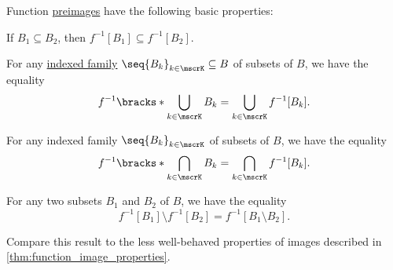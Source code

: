 \begin{proposition}\label{thm:function_preimage_properties}
  Function \hyperref[def:set_valued_map/inverse]{preimages} have the following basic properties:
  \begin{thmenum}
     If \( B_1 \subseteq B_2 \), then \( f^{-1}[B_1] \subseteq f^{-1}[B_2] \).

     For any \hyperref[def:indexed_family]{indexed family} \( \seq{ B_k }_{k \in \mscrK} \subseteq B \) of subsets of \( B \), we have the equality
    \begin{equation}\label{eq:thm:function_preimage_properties/union}
      f^{-1}\bracks*{ \bigcup_{k \in \mscrK} B_k } = \bigcup_{k \in \mscrK} f^{-1}[B_k].
    \end{equation}

     For any indexed family \( \seq{ B_k }_{k \in \mscrK} \) of subsets of \( B \), we have the equality
    \begin{equation}\label{eq:thm:function_preimage_properties/intersection}
      f^{-1}\bracks*{ \bigcap_{k \in \mscrK} B_k } = \bigcap_{k \in \mscrK} f^{-1}[B_k].
    \end{equation}

     For any two subsets \( B_1 \) and \( B_2 \) of \( B \), we have the equality
    \begin{equation}\label{eq:thm:function_preimage_properties/difference}
      f^{-1}[B_1] \setminus f^{-1}[B_2] = f^{-1}[B_1 \setminus B_2].
    \end{equation}
  \end{thmenum}
\end{proposition}
\begin{comments}
  \item Compare this result to the less well-behaved properties of images described in \cref{thm:function_image_properties}.
\end{comments}
